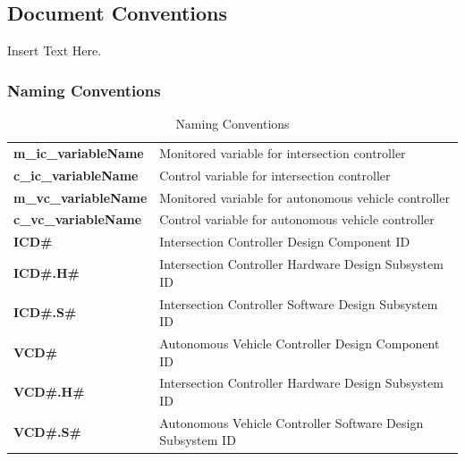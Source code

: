 \documentclass [10pt]{article}
\begin{document}
\subsection{Document Conventions}
Insert Text Here.

 
\subsubsection{Naming Conventions}


\begin{longtable}{ |p{ } p{ }|} \caption{Naming Conventions} \\ \hline

\textbf{m\_ic\_variableName} & Monitored variable for intersection controller \\ 

\cellcolor{tableCell}\textbf{c\_ic\_variableName}  & \cellcolor{tableCell}Control variable for intersection controller \\ 

\textbf{m\_vc\_variableName} & Monitored variable for autonomous vehicle controller \\ 

\cellcolor{tableCell}\textbf{c\_vc\_variableName}  & \cellcolor{tableCell}Control variable for autonomous vehicle controller \\ 

\textbf{ICD\#} & Intersection Controller Design Component ID \\ 

\cellcolor{tableCell}\textbf{ICD\#.H\#}  & \cellcolor{tableCell}Intersection Controller Hardware Design Subsystem ID \\

\textbf{ICD\#.S\#} & Intersection Controller Software Design Subsystem ID \\ 

\cellcolor{tableCell}\textbf{VCD\#}  & \cellcolor{tableCell}Autonomous Vehicle Controller Design Component ID\\  

\textbf{VCD\#.H\#} & Intersection Controller Hardware Design Subsystem ID \\ 

\cellcolor{tableCell}\textbf{VCD\#.S\#}  & \cellcolor{tableCell}Autonomous Vehicle Controller Software Design Subsystem ID \\\hline



\end{longtable}
\end{document}
